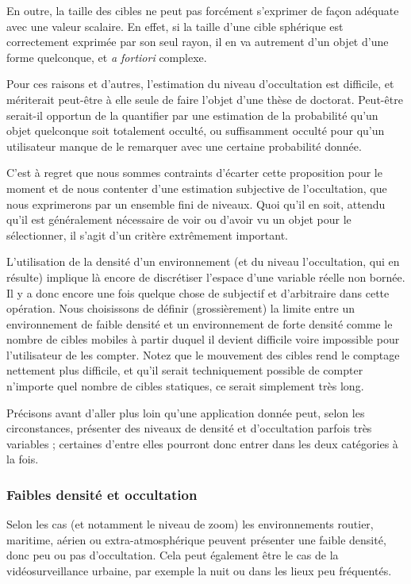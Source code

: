 	En outre, la \og taille \fg{} des cibles ne peut pas forcément s'exprimer de façon adéquate avec une valeur scalaire. En effet, si la taille d'une cible sphérique est correctement exprimée par son seul rayon, il en va autrement d'un objet d'une forme quelconque, et \emph{a fortiori} complexe.
	
	Pour ces raisons et d'autres, l'estimation du niveau d'occultation est difficile, et mériterait peut-être à elle seule de faire l'objet d'une thèse de doctorat. Peut-être serait-il opportun de la quantifier par une estimation de la probabilité qu'un objet quelconque soit totalement occulté, ou suffisamment occulté pour qu'un utilisateur manque de le remarquer avec une certaine probabilité donnée.
	
	C'est à regret que nous sommes contraints d'écarter cette proposition pour le moment et de nous contenter d'une estimation subjective de l'occultation, que nous exprimerons par un ensemble fini de niveaux. Quoi qu'il en soit, attendu qu'il est généralement nécessaire de voir ou d'avoir vu un objet pour le sélectionner, il s'agit d'un critère extrêmement important.
	
	L'utilisation de la densité d'un environnement (et du niveau l'occultation, qui en résulte) implique là encore de discrétiser l'espace d'une variable réelle non bornée. Il y a donc encore une fois quelque chose de subjectif et d'arbitraire dans cette opération. Nous choisissons de définir (grossièrement) la limite entre un environnement de faible densité et un environnement de forte densité comme le nombre de cibles mobiles à partir duquel il devient difficile voire impossible pour l'utilisateur de les compter. Notez que le mouvement des cibles rend le comptage nettement plus difficile, et qu'il serait techniquement possible de compter n'importe quel nombre de cibles statiques, ce serait simplement très long.
	
	Précisons avant d'aller plus loin qu'une application donnée peut, selon les circonstances, présenter des niveaux de densité et d'occultation parfois très variables ; certaines d'entre elles pourront donc entrer dans les deux catégories à la fois.
	
	\subsubsection{Faibles densité et occultation}
	Selon les cas (et notamment le niveau de zoom) les environnements routier, maritime, aérien ou extra-atmosphérique peuvent présenter une faible densité, donc peu ou pas d'occultation. Cela peut également être le cas de la vidéosurveillance urbaine, par exemple la nuit ou dans les lieux peu fréquentés.
	
